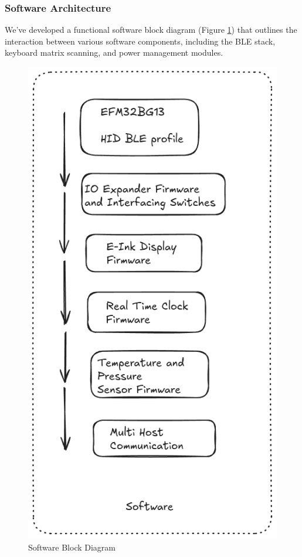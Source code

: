\documentclass[a4paper,11pt]{article}%
\begin{document}
\subsubsection{Software Architecture}
We've developed a functional software block diagram (Figure \ref{fig:software_diagram}) that outlines the interaction between various software components, including the BLE stack, keyboard matrix scanning, and power management modules.

\begin{figure}[H]
    \centering
    \includegraphics[scale=0.44]{figures/software_diagram.png}
    \caption{Software Block Diagram}
    \label{fig:software_diagram}
\end{figure}
\end{document}

